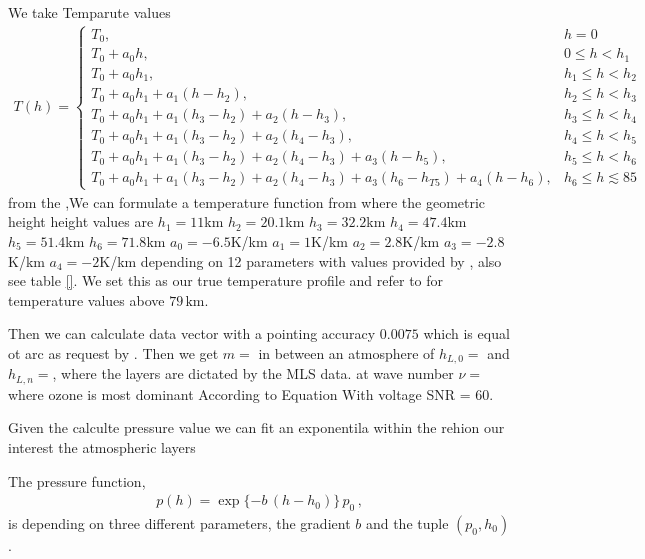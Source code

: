 We take Temparute values 
\begin{align}
	T(h) = \begin{cases*}
		T_0, & \text{$h = 0$}\\
		T_0 + a_0 h , & \text{$0 \leq h < h_{1}$}\\
		T_0 + a_0 h_{1}, & \text{$h_{1} \leq  h < h_{2}$}\\
		T_0 + a_0 h_{1} + a_1 (h   - h_2),  & \text{$h_{2} \leq h < h_{3}$}\\
		T_0 + a_0 h_{1} + a_1 (h_{3} - h_{2}) + a_2 (h   - h_3), & \text{$h_{3} \leq h < h_{4}$}\\
		T_0 + a_0 h_{1} + a_1 (h_{3} - h_{2}) + a_2 (h_{4} - h_{3}), & \text{$h_{4} \leq h < h_{5}$}\\
		T_0 + a_0 h_{1} + a_1 (h_{3} - h_{2}) + a_2 (h_{4} - h_{3}) + a_3 (h   - h_{5}), & \text{$h_{5} \leq h < h_{6}$}\\
		T_0 + a_0 h_{1} + a_1 (h_{3} - h_{2}) + a_2 (h_{4} - h_{3}) + a_3 (h_{6} - h_{T5}) + a_4 (h - h_{6}), & \text{$h_{6} \leq h \lesssim 85$}
	\end{cases*} 
	\label{eq:tempFunc}
\end{align}
from the \cite{atmosphere1976us},We can formulate a temperature function from \cite{atmosphere1976us}
where the geometric height height values are
$h_{1} = 11$km
$h_{2} = 20.1$km
$h_{3} = 32.2$km
$h_{4} = 47.4$km
$h_{5} = 51.4$km
$h_{6} = 71.8$km
$a_{0} = -6.5$K/km
$a_{1} = 1$K/km
$a_{2} = 2.8$K/km
$a_{3} = -2.8$K/km
$a_{4} = -2$K/km
depending on 12 parameters with values provided by \cite{}, also see table \ref{}.
We set this as our true temperature profile and refer to \cite{} for temperature values above $79 \,\text{km}$.


\cite{CubeSatInternal}
\cite{MLSdata}
\cite{vsimevckova2006einstein}
\cite{christentwalkaccess}
\cite{Fox_ISBA2008}
\cite{mipas2000handbook}
\cite{gordon2022hitran2020}
\cite{atmosphere1976us}



Then we can calculate data vector with a pointing accuracy $0.0075$ which is equal ot arc as request by \cite{CubeSatInternal}.
Then we get $m = $ in between an atmosphere of $h_{L,0} = $ and $h_{L,n} = $, where the layers are dictated by the MLS data.
at wave number $\nu = $ where ozone is most dominant
According to Equation
With voltage SNR = $60$.

Given the calculte pressure value we can fit an exponentila within the rehion our interest the atmospheric layers

The pressure function,
\begin{align}
	p(h) =
	\exp{ \{ -b \,  (h - h_{0} ) \} } \,  p_0 \, ,
	\label{eq:pressFunc}
\end{align}
is depending on three different parameters, the gradient $b$ and the tuple $(p_0,h_{0})$.

